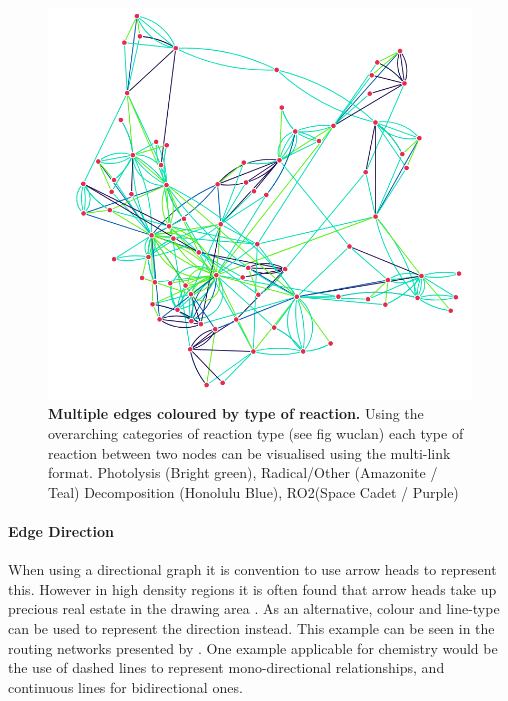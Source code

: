 \begin{figure}[H]
     \centering
     \includegraphics[width=.7\textwidth]{figures_c1/edgetype/multiquadratic.png}
        \caption{\textbf{Multiple edges coloured by type of reaction.} Using the overarching categories of reaction type (see fig wuclan) each type of reaction between two nodes can be visualised using the multi-link format. Photolysis (Bright green), Radical/Other (Amazonite / Teal) Decomposition (Honolulu Blue), RO2(Space Cadet / Purple)}
      \label{fig:multiedge}
\end{figure}

% 





\paragraph{Edge Direction}
When using a directional graph it is convention to use arrow heads to represent this. However in high density regions it is often found that arrow heads take up precious real estate in the drawing area \cite{noarredge}. As an alternative, colour and line-type can be used to represent the direction instead. This example can be seen in the routing networks presented by \cite{networkrouting}. One example applicable for chemistry would be the use of dashed lines to represent mono-directional relationships, and continuous lines for bidirectional ones. 









